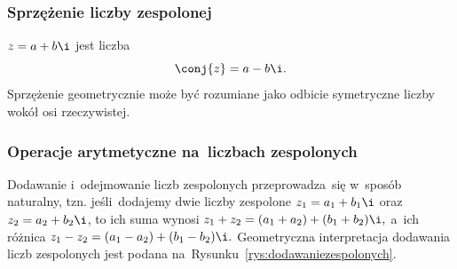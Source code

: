 \subsubsection{Sprzężenie liczby zespolonej}
 $z = a + b\i$ jest liczba
$$
	\conj{z} = a - b\i.
$$
Sprzężenie geometrycznie może być rozumiane jako odbicie symetryczne liczby wokół osi rzeczywistej.

\subsubsection{Operacje arytmetyczne na~liczbach zespolonych}
Dodawanie i~odejmowanie liczb zespolonych przeprowadza~się w~sposób naturalny, tzn.
jeśli~dodajemy dwie liczby zespolone $z_1 = a_1 + b_1 \i$ oraz~$z_2 = a_2 + b_2 \i$, to
ich suma wynosi
$z_1 + z_2 = (a_1 + a_2) + (b_1 + b_2) \i,$
a~ich różnica
$z_1 - z_2 = (a_1 - a_2) + (b_1 - b_2) \i.$
Geometryczna interpretacja dodawania
liczb zespolonych jest podana na~Rysunku~\ref{rys:dodawaniezespolonych}.

